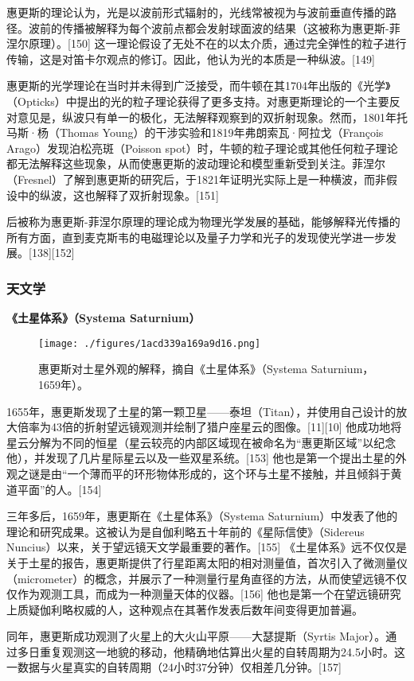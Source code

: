 惠更斯的理论认为，光是以波前形式辐射的，光线常被视为与波前垂直传播的路径。波前的传播被解释为每个波前点都会发射球面波的结果（这被称为惠更斯-菲涅尔原理）。[150] 这一理论假设了无处不在的以太介质，通过完全弹性的粒子进行传输，这是对笛卡尔观点的修订。因此，他认为光的本质是一种纵波。[149]

惠更斯的光学理论在当时并未得到广泛接受，而牛顿在其1704年出版的《光学》（Opticks）中提出的光的粒子理论获得了更多支持。对惠更斯理论的一个主要反对意见是，纵波只有单一的极化，无法解释观察到的双折射现象。然而，1801年托马斯·杨（Thomas Young）的干涉实验和1819年弗朗索瓦·阿拉戈（François Arago）发现泊松亮斑（Poisson spot）时，牛顿的粒子理论或其他任何粒子理论都无法解释这些现象，从而使惠更斯的波动理论和模型重新受到关注。菲涅尔（Fresnel）了解到惠更斯的研究后，于1821年证明光实际上是一种横波，而非假设中的纵波，这也解释了双折射现象。[151]

后被称为惠更斯-菲涅尔原理的理论成为物理光学发展的基础，能够解释光传播的所有方面，直到麦克斯韦的电磁理论以及量子力学和光子的发现使光学进一步发展。[138][152]
\subsubsection{天文学}
\textbf{《土星体系》（Systema Saturnium）}
\begin{figure}[ht]
\centering
\texttt{[image: ./figures/1acd339a169a9d16.png]}
\caption{惠更斯对土星外观的解释，摘自《土星体系》（Systema Saturnium，1659年）。} \label{fig_HGS_15}
\end{figure}
1655年，惠更斯发现了土星的第一颗卫星——泰坦（Titan），并使用自己设计的放大倍率为43倍的折射望远镜观测并绘制了猎户座星云的图像。[11][10] 他成功地将星云分解为不同的恒星（星云较亮的内部区域现在被命名为“惠更斯区域”以纪念他），并发现了几片星际星云以及一些双星系统。[153] 他也是第一个提出土星的外观之谜是由“一个薄而平的环形物体形成的，这个环与土星不接触，并且倾斜于黄道平面”的人。[154]

三年多后，1659年，惠更斯在《土星体系》（Systema Saturnium）中发表了他的理论和研究成果。这被认为是自伽利略五十年前的《星际信使》（Sidereus Nuncius）以来，关于望远镜天文学最重要的著作。[155] 《土星体系》远不仅仅是关于土星的报告，惠更斯提供了行星距离太阳的相对测量值，首次引入了微测量仪（micrometer）的概念，并展示了一种测量行星角直径的方法，从而使望远镜不仅仅作为观测工具，而成为一种测量天体的仪器。[156] 他也是第一个在望远镜研究上质疑伽利略权威的人，这种观点在其著作发表后数年间变得更加普遍。

同年，惠更斯成功观测了火星上的大火山平原——大瑟提斯（Syrtis Major）。通过多日重复观测这一地貌的移动，他精确地估算出火星的自转周期为24.5小时。这一数据与火星真实的自转周期（24小时37分钟）仅相差几分钟。[157]

